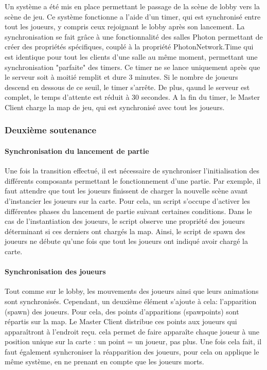             Un système a été mis en place permettant le passage de la scène de lobby vers la scène de jeu.
            Ce système fonctionne a l'aide d'un timer, qui est synchronisé entre tout les joueurs, y compris ceux
            rejoignant le lobby après son lancement. La synchronisation se fait grâce à une fonctionnalité des salles Photon
            permettant de créer des propriétés spécifiques, couplé à la propriété PhotonNetwork.Time qui
            est identique pour tout les clients d'une salle au même moment, permettant une synchronisation
            "parfaite" des timers.
            Ce timer ne se lance uniquement après que le serveur soit à moitié remplit et dure 3 minutes. Si le nombre de joueurs descend en dessous de ce seuil, le timer s'arrête. De plus, qaund le serveur
            est complet, le temps d'attente est réduit à 30 secondes.
            A la fin du timer, le Master Client charge la map de jeu, qui est synchronisé avec tout les joueurs.



    \subsubsection{Deuxième soutenance}


        \paragraph{Synchronisation du lancement de partie}
        
            Une fois la transition effectué, il est nécessaire de synchroniser l'initialisation des différents composants
            permettant le fonctionnement d'une partie. Par exemple, il faut attendre que tout les joueurs finissent de charger
            la nouvelle scène avant d'instancier les joueurs sur la carte. Pour cela, un script s'occupe d'activer les différentes phases
            du lancement de partie suivant certaines conditions. Dans le cas de l'instantiation des joueurs, le script observe une propriété
            des joueurs déterminant si ces derniers ont chargés la map. Ainsi, le script de spawn des joueurs ne débute qu'une fois que tout les joueurs
            ont indiqué avoir chargé la carte.

        \paragraph{Synchronisation des joueurs}

            Tout comme sur le lobby, les mouvements des joueurs ainsi que leurs animations sont synchronisés. Cependant,
            un deuxième élément s'ajoute à cela: l'apparition (spawn) des joueurs. Pour cela, des points d'apparitions (spawpoints)
            sont répartis sur la map. Le Master Client distribue ces points aux joueurs qui apparaîtront à l'endroit reçu. cela permet
            de faire apparaîte chaque joueur à une position unique sur la carte : un point = un joueur, pas plus. Une fois cela fait,
            il faut également synhcroniser la réapparition des joueurs, pour cela on applique le même système, en ne prenant en compte que les joueurs
            morts.

